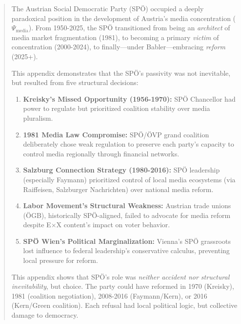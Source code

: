 \begin{abstract}

The Austrian Social Democratic Party (SPÖ) occupied a deeply paradoxical position in the development
of Austria's media concentration ($\Psi_{\text{media}}$). From 1950-2025, the SPÖ transitioned from
being an \textit{architect} of media market fragmentation (1981), to becoming a primary \textit{victim}
of concentration (2000-2024), to finally—under Babler—embracing \textit{reform} (2025+).

This appendix demonstrates that the SPÖ's passivity was not inevitable, but resulted from five structural
decisions:

\begin{enumerate}
\item \textbf{Kreisky's Missed Opportunity (1956-1970):} SPÖ Chancellor had power to regulate but prioritized
  coalition stability over media pluralism.

\item \textbf{1981 Media Law Compromise:} SPÖ/ÖVP grand coalition deliberately chose weak regulation to preserve
  each party's capacity to control media regionally through financial networks.

\item \textbf{Salzburg Connection Strategy (1980-2016):} SPÖ leadership (especially Faymann) prioritized control
  of local media ecosystems (via Raiffeisen, Salzburger Nachrichten) over national media reform.

\item \textbf{Labor Movement's Structural Weakness:} Austrian trade unions (ÖGB), historically SPÖ-aligned, failed
  to advocate for media reform despite E×X content's impact on voter behavior.

\item \textbf{SPÖ Wien's Political Marginalization:} Vienna's SPÖ grassroots lost influence to federal leadership's
  conservative calculus, preventing local pressure for reform.

\end{enumerate}

This appendix shows that SPÖ's role was \textit{neither accident nor structural inevitability}, but choice.
The party could have reformed in 1970 (Kreisky), 1981 (coalition negotiation), 2008-2016 (Faymann/Kern),
or 2016 (Kern/Green coalition). Each refusal had local political logic, but collective damage to democracy.

\end{abstract}


